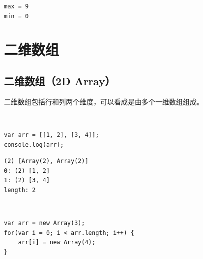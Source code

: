 \begin{tcolorbox}
	\begin{verbatim}
max = 9
min = 0
	\end{verbatim}
\end{tcolorbox}

\newpage

\section{二维数组}

\subsection{二维数组（2D Array）}

二维数组包括行和列两个维度，可以看成是由多个一维数组组成。

\begin{table}[H]
	\centering
\end{table}

 \\

\begin{lstlisting}[style=htmlcssjs]
var arr = [[1, 2], [3, 4]];
console.log(arr);
\end{lstlisting}

\begin{tcolorbox}
	\begin{verbatim}
(2) [Array(2), Array(2)]
0: (2) [1, 2]
1: (2) [3, 4]
length: 2
	\end{verbatim}
\end{tcolorbox}

\vspace{0.5cm}

 \\

\begin{lstlisting}[style=htmlcssjs]
var arr = new Array(3);
for(var i = 0; i < arr.length; i++) {
    arr[i] = new Array(4);
}
\end{lstlisting}

